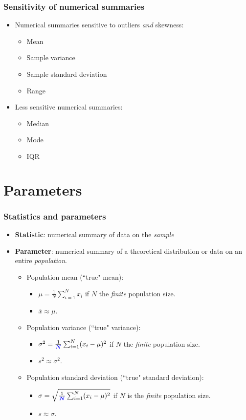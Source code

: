 \documentclass{beamer}
\providecommand{\ov}[1]{\overline{#1}}
\providecommand{\vc}[1]{\boldsymbol{#1}}
\numberwithin{equation}{section}
\begin{document}
\begin{frame}
\frametitle{Sensitivity of numerical summaries}
\begin{itemize}
\item Numerical summaries sensitive to outliers \emph{and} skewness:
\begin{itemize}
\item Mean
\item Sample variance
\item Sample standard deviation
\item Range
\end{itemize}
\item Less sensitive numerical summaries:
\begin{itemize}
\item Median
\item Mode
\item IQR
\end{itemize}
\end{itemize}
\end{frame}


\section{Parameters}

\begin{frame}
\frametitle{Statistics and parameters}
\begin{itemize}
\item {\bf Statistic}: numerical summary of data on the \emph{sample}
\pause \item {\bf Parameter}: numerical summary of a theoretical distribution or data on an entire \emph{population}. 
\begin{itemize}
\pause \item Population mean (``true" mean):
\begin{itemize}
\pause \item $\mu = \frac{1}{N} \sum_{i = 1}^N x_i$ if $N$ the \emph{finite} population size.
\pause \item $\ov{x} \approx \mu$.
\end{itemize}
\pause \item Population variance (``true" variance):
\begin{itemize}
\pause \item $\sigma^2 = \frac{1}{\color{blue} \vc N} \sum_{i = 1}^N (x_i - \mu)^2$ if $N$ the \emph{finite} population size.
\pause \item $s^2 \approx \sigma^2$.
\end{itemize}
\pause \item Population standard deviation (``true" standard deviation):
\begin{itemize}
\pause \item $\sigma = \sqrt{ \frac{1}{\color{blue} \vc N} \sum_{i = 1}^N (x_i - \mu)^2}$ if $N$ is the \emph{finite} population size.
\pause \item $s \approx \sigma$.
\end{itemize}
\end{itemize}
\end{itemize}
\end{frame}



\end{document}

